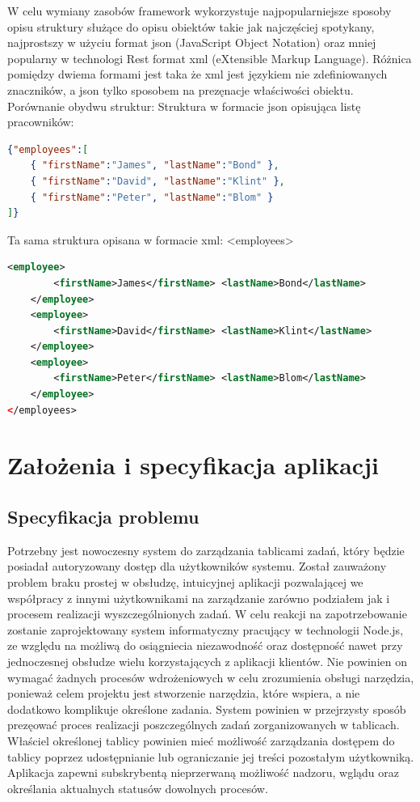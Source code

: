 \documentclass[12pt]{report}
\begin{document}
W celu wymiany zasobów framework wykorzystuje najpopularniejsze sposoby opisu struktury służące do opisu obiektów takie jak najczęściej spotykany, najprostszy w użyciu format json (JavaScript Object Notation) oraz mniej popularny w technologi Rest format xml (eXtensible Markup Language). 
Różnica pomiędzy dwiema formami jest taka że xml jest językiem nie zdefiniowanych znaczników, a json tylko sposobem na prezęnacje właściwości obiektu. 
Porównanie obydwu struktur:
Struktura w formacie json opisująca listę pracowników:
\begin{lstlisting}[language=json,firstnumber=1]
{"employees":[
	{ "firstName":"James", "lastName":"Bond" },
	{ "firstName":"David", "lastName":"Klint" },
	{ "firstName":"Peter", "lastName":"Blom" }
]}
\end{lstlisting}

Ta sama struktura opisana w formacie xml:
<employees>
\begin{lstlisting}[language=XML,firstnumber=1]
	<employee>
		<firstName>James</firstName> <lastName>Bond</lastName>
	</employee>
	<employee>
		<firstName>David</firstName> <lastName>Klint</lastName>
	</employee>
	<employee>
		<firstName>Peter</firstName> <lastName>Blom</lastName>
	</employee>
</employees>
\end{lstlisting}


\chapter{Założenia i specyfikacja aplikacji}

\section{Specyfikacja problemu}
Potrzebny jest nowoczesny system do zarządzania tablicami zadań, który będzie posiadał autoryzowany dostęp dla użytkowników systemu. 
Został zauważony problem braku prostej w obsłudzę, intuicyjnej aplikacji pozwalającej we współpracy z innymi użytkownikami na zarządzanie zarówno podziałem jak i procesem realizacji wyszczególnionych zadań.
W celu reakcji na zapotrzebowanie zostanie zaprojektowany system informatyczny pracujący w technologii Node.js, ze względu na możliwą do osiągniecia niezawodność oraz dostępność nawet przy jednoczesnej obsłudze wielu korzystających z aplikacji klientów.
Nie powinien on wymagać żadnych procesów wdrożeniowych w celu zrozumienia obsługi narzędzia, ponieważ celem projektu jest stworzenie narzędzia, które wspiera, a nie dodatkowo komplikuje określone zadania.
System powinien w przejrzysty sposób prezęować proces realizacji poszczególnych zadań zorganizowanych w tablicach.
Właściel określonej tablicy powinien mieć możliwość zarządzania dostępem do tablicy poprzez udostępnianie lub ograniczanie jej treści pozostałym użytkowniką.
Aplikacja zapewni subskrybentą nieprzerwaną możliwość nadzoru, wglądu oraz określania aktualnych statusów dowolnych procesów.
\end{document}
